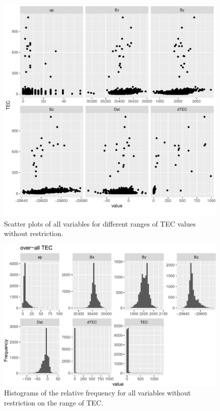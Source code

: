 \documentclass[sn-mathphys-num]{sn-jnl}%
\begin{document}
\begin{figure}
    \centering
    \includegraphics[width=0.9\linewidth]{dataset2scatterplot.pdf}
    \caption{Scatter plots of all variables for different ranges of TEC values without restriction.}
    \label{fig:dataset2scatterplot}
\end{figure}

\begin{figure}
    \centering
    \includegraphics[width=0.9\linewidth]{allTEC_fix.pdf}
    \caption{Histograms of the relative frequency for all variables without restriction on the range of TEC.}
    \label{fig:allTEC}
\end{figure}
\end{document}
